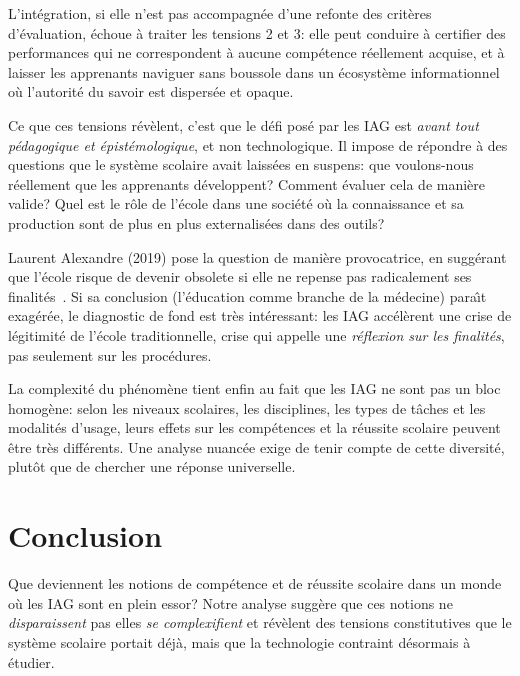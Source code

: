 L'int\'egration, si elle n'est pas accompagn\'ee d'une refonte des crit\`eres d'\'evaluation, \'echoue \`a traiter les tensions 2 et 3: elle peut conduire \`a certifier des performances qui ne correspondent \`a aucune comp\'etence r\'eellement acquise, et \`a laisser les apprenants naviguer sans boussole dans un \'ecosyst\`eme informationnel o\`u l'autorit\'e du savoir est dispers\'ee et opaque.

Ce que ces tensions r\'ev\`elent, c'est que le d\'efi pos\'e par les IAG est \emph{avant tout p\'edagogique et \'epist\'emologique}, et non technologique. 
Il impose de r\'epondre \`a des questions que le syst\`eme scolaire avait laiss\'ees en suspens: que voulons-nous r\'eellement que les apprenants d\'eveloppent? 
Comment \'evaluer cela de mani\`ere valide? 
Quel est le r\^ole de l'\'ecole dans une soci\'et\'e o\`u la connaissance et sa production sont de plus en plus externalis\'ees dans des outils?

Laurent Alexandre (2019) pose la question de mani\`ere provocatrice, en sugg\'erant que l'\'ecole risque de devenir obsolete si elle ne repense pas radicalement ses finalit\'es~\cite{alexandre2019}.
Si sa conclusion (l'\'education comme \og{}branche de la m\'edecine\fg{}) para\^\i t exag\'er\'ee, le diagnostic de fond est tr\`es int\'eressant: les IAG acc\'el\`erent une crise de l\'egitimit\'e de l'\'ecole traditionnelle, crise qui appelle une \emph{r\'eflexion sur les finalit\'es}, pas seulement sur les proc\'edures.

La complexit\'e du ph\'enom\`ene tient enfin au fait que les IAG ne sont pas un bloc homog\`ene: selon les niveaux scolaires, les disciplines, les types de t\^aches et les modalit\'es d'usage, leurs effets sur les comp\'etences et la r\'eussite scolaire peuvent \^etre tr\`es diff\'erents.
Une analyse nuanc\'ee exige de tenir compte de cette diversit\'e, plut\^ot que de chercher une r\'eponse universelle.


\newpage
\section{Conclusion}\label{sec:conclusion}


Que deviennent les notions de comp\'etence et de r\'eussite scolaire dans un monde o\`u les IAG
sont en plein essor? 
Notre analyse sugg\`ere que ces notions ne \emph{disparaissent} pas elles \emph{se complexifient} et r\'ev\`elent des tensions constitutives que le syst\`eme scolaire portait d\'ej\`a, mais que la technologie contraint d\'esormais \`a \'etudier.

